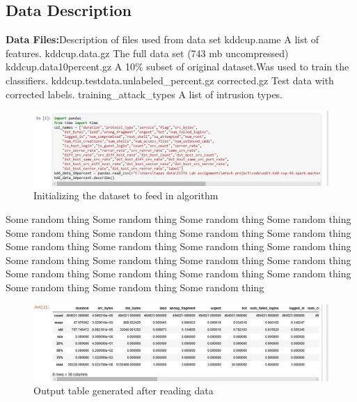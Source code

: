 \subsection{Data Description}
\textbf{Data Files:}Description of files used from data set\newline
kddcup.name A list of features.\newline
kddcup.data.gz The full data set (743 mb uncompressed)\newline
kddcup.data\textunderscore10percent.gz  A 10\% subset of original dataset.Was used to train the classifiers.\newline
kddcup.testdata.unlabeled\_percent.gz
corrected.gz Test data with corrected labels.\newline
training\_attack\_types A list of intrusion types.\newline
\begin{figure}[H]
    \centering
    \includegraphics[width=15cm]{texfiles/images/code1.jpg}
    \caption{Initializing the dataset to feed in algorithm}
    \label{fig:code1}
\end{figure}
Some random thing Some random thing Some random thing Some random thing Some random thing Some random thing Some random thing Some random thing Some random thing Some random thing Some random thing Some random thing Some random thing Some random thing Some random thing Some random thing Some random thing Some random thing Some random thing Some random thing Some random thing Some random thing Some random thing  
\begin{figure}[H]
    \centering
    \includegraphics[width=15cm]{texfiles/images/code2.jpg}
    \caption{Output table generated after reading data}
    \label{fig:code2}
\end{figure}

